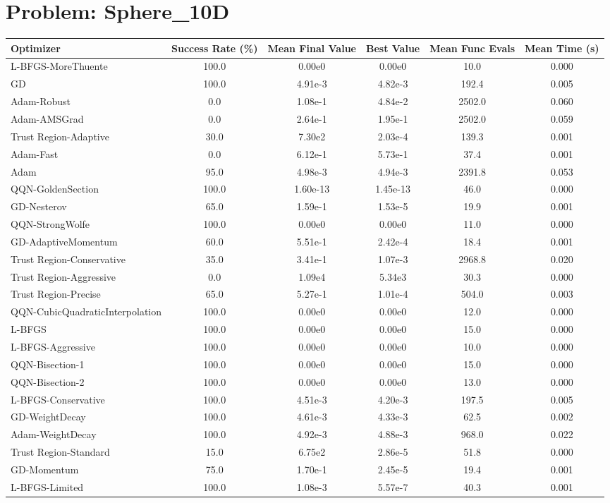 \documentclass{article}
\begin{document}
\section{Problem: Sphere\_10D}
\begin{longtable}{p{3cm}*{5}{c}}
\toprule
\textbf{Optimizer} & \textbf{Success Rate (\%)} & \textbf{Mean Final Value} & \textbf{Best Value} & \textbf{Mean Func Evals} & \textbf{Mean Time (s)} \\
\midrule
L-BFGS-MoreThuente & 100.0 & 0.00e0 & 0.00e0 & 10.0 & 0.000 \\
GD & 100.0 & 4.91e-3 & 4.82e-3 & 192.4 & 0.005 \\
Adam-Robust & 0.0 & 1.08e-1 & 4.84e-2 & 2502.0 & 0.060 \\
Adam-AMSGrad & 0.0 & 2.64e-1 & 1.95e-1 & 2502.0 & 0.059 \\
Trust Region-Adaptive & 30.0 & 7.30e2 & 2.03e-4 & 139.3 & 0.001 \\
Adam-Fast & 0.0 & 6.12e-1 & 5.73e-1 & 37.4 & 0.001 \\
Adam & 95.0 & 4.98e-3 & 4.94e-3 & 2391.8 & 0.053 \\
QQN-GoldenSection & 100.0 & 1.60e-13 & 1.45e-13 & 46.0 & 0.000 \\
GD-Nesterov & 65.0 & 1.59e-1 & 1.53e-5 & 19.9 & 0.001 \\
QQN-StrongWolfe & 100.0 & 0.00e0 & 0.00e0 & 11.0 & 0.000 \\
GD-AdaptiveMomentum & 60.0 & 5.51e-1 & 2.42e-4 & 18.4 & 0.001 \\
Trust Region-Conservative & 35.0 & 3.41e-1 & 1.07e-3 & 2968.8 & 0.020 \\
Trust Region-Aggressive & 0.0 & 1.09e4 & 5.34e3 & 30.3 & 0.000 \\
Trust Region-Precise & 65.0 & 5.27e-1 & 1.01e-4 & 504.0 & 0.003 \\
QQN-CubicQuadraticInterpolation & 100.0 & 0.00e0 & 0.00e0 & 12.0 & 0.000 \\
L-BFGS & 100.0 & 0.00e0 & 0.00e0 & 15.0 & 0.000 \\
L-BFGS-Aggressive & 100.0 & 0.00e0 & 0.00e0 & 10.0 & 0.000 \\
QQN-Bisection-1 & 100.0 & 0.00e0 & 0.00e0 & 15.0 & 0.000 \\
QQN-Bisection-2 & 100.0 & 0.00e0 & 0.00e0 & 13.0 & 0.000 \\
L-BFGS-Conservative & 100.0 & 4.51e-3 & 4.20e-3 & 197.5 & 0.005 \\
GD-WeightDecay & 100.0 & 4.61e-3 & 4.33e-3 & 62.5 & 0.002 \\
Adam-WeightDecay & 100.0 & 4.92e-3 & 4.88e-3 & 968.0 & 0.022 \\
Trust Region-Standard & 15.0 & 6.75e2 & 2.86e-5 & 51.8 & 0.000 \\
GD-Momentum & 75.0 & 1.70e-1 & 2.45e-5 & 19.4 & 0.001 \\
L-BFGS-Limited & 100.0 & 1.08e-3 & 5.57e-7 & 40.3 & 0.001 \\
\bottomrule
\end{longtable}
\end{document}

